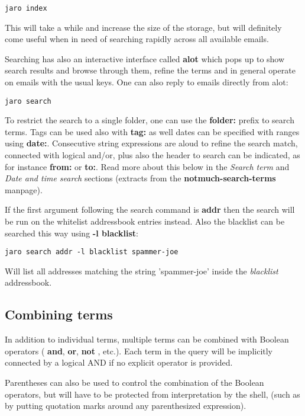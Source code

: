 \documentclass[a4,onecolumn,portrait]{article}
\begin{document}
\begin{verbatim}
jaro index
\end{verbatim}

This will take a while and increase the size of the storage, but will definitely come useful when in need of searching rapidly across all available emails.

Searching has also an interactive interface called \textbf{alot} which pops up to show search results and browse through them, refine the terms and in general operate on emails with the usual keys. One can also reply to emails directly from alot:

\begin{verbatim}
jaro search
\end{verbatim}

To restrict the search to a single folder, one can use the \textbf{folder:} prefix to search terms. Tags can be used also with \textbf{tag:} as well dates can be specified with ranges using \textbf{date:}. Consecutive string expressions are aloud to refine the search match, connected with logical and/or, plus also the header to search can be indicated, as for instance \textbf{from:} or \textbf{to:}. Read more about this below in the \emph{Search term} and \emph{Date and time search} sections (extracts from the \textbf{notmuch-search-terms} manpage).


If the first argument following the search command is \textbf{addr} then the search will be run on the whitelist addressbook entries instead. Also the blacklist can be searched this way using \textbf{-l blacklist}:

\begin{verbatim}
jaro search addr -l blacklist spammer-joe
\end{verbatim}

Will list all addresses matching the string 'spammer-joe' inside the \emph{blacklist} addressbook.

\subsection{Combining terms}
\label{sec-8-1}

In addition to individual terms, multiple terms can be combined with Boolean operators ( \textbf{and}, \textbf{or}, \textbf{not} , etc.). Each term in the query will be implicitly connected by a logical AND if no explicit operator is provided.

Parentheses can also be used to control the combination of the Boolean operators, but will have to be protected from interpretation by the shell, (such as by putting quotation marks around any parenthesized expression).
\end{document}
